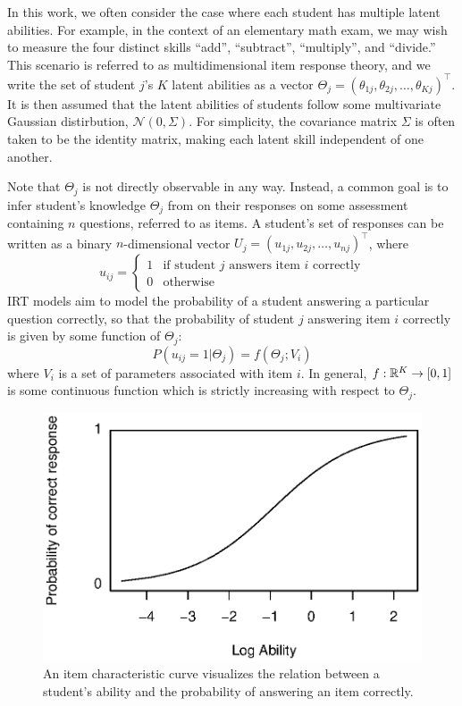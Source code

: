 In this work, we often consider the case where each student has multiple latent abilities. For example, in the context of an elementary math exam, we may wish to measure the four distinct skills ``add'', ``subtract'', ``multiply'', and ``divide.'' This scenario is referred to as multidimensional item response theory, and we write the set of student $j$'s $K$ latent abilities as a vector $\Theta_j = (\theta_{1j}, \theta_{2j}, \ldots, \theta_{Kj})^\top$. It is then assumed that the latent abilities of students follow some multivariate Gaussian distirbution, $\mathcal{N}(0, \Sigma)$. For simplicity, the covariance matrix $\Sigma$ is often taken to be the identity matrix, making each latent skill independent of one another.

Note that $\Theta_j$ is not directly observable in any way. Instead, a common goal is to infer student's knowledge $\Theta_j$ from on their responses on some assessment containing $n$ questions, referred to as items. A student's set of responses can be written as a binary $n$-dimensional vector $U_j = (u_{1j}, u_{2j}, \ldots, u_{nj})^\top$, where 
\begin{equation}
  u_{ij} = \begin{cases} 1 & \text{if student } j \text{ answers item } i \text{ correctly} \\0 & \text{otherwise} \end{cases} 
\end{equation}
IRT models aim to model the probability of a student answering a particular question correctly, so that the probability of student $j$ answering item $i$ correctly is given by some function of $\Theta_j$:
\begin{equation}
  P(u_{ij} = 1 | \Theta_j) = f(\Theta_j; V_i)
\end{equation}
where $V_i$ is a set of parameters associated with item $i$. In general, $f:\mathbb{R}^K \to [0,1]$ is some continuous function which is strictly increasing with respect to $\Theta_j$.

\begin{figure}[h]
  \centering
  \includegraphics[width=.6\textwidth, angle=90]{img/logistic_1param_icc.eps}
  \caption{An item characteristic curve visualizes the relation between a student's ability and the probability of answering an item correctly.}
  \label{fig:icc}
\end{figure}

